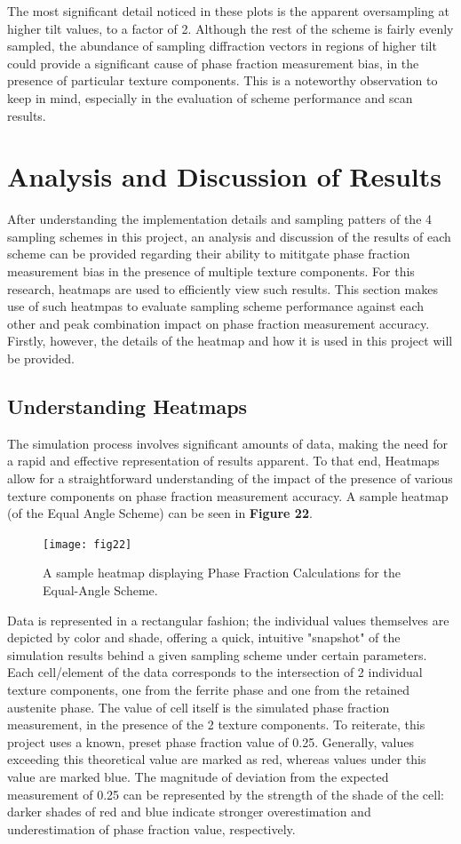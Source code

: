 \documentclass[10pt]{article}
\begin{document}
The most significant detail noticed in these plots is the apparent oversampling at higher tilt values, to a factor of 2. Although the rest
of the scheme is fairly evenly sampled, the abundance of sampling diffraction vectors in regions of higher tilt could provide a significant 
cause of phase fraction measurement bias, in the presence of particular texture components. This is a noteworthy observation to keep in mind,
especially in the evaluation of scheme performance and scan results.

\section{Analysis and Discussion of Results}
After understanding the implementation details and sampling patters of the 4 sampling schemes in this project, an analysis 
and discussion of the results of each scheme can be provided regarding their ability to mititgate phase fraction measurement
bias in the presence of multiple texture components. For this research, heatmaps are used to efficiently view such results. This section
makes use of such heatmpas to evaluate sampling scheme performance against each other and peak combination impact on phase fraction
measurement accuracy. Firstly, however,
the details of the heatmap and how it is used in this project will be provided.
\subsection{Understanding Heatmaps}
The simulation process involves significant amounts of data, making the need for a rapid and effective representation of results apparent. To that end, Heatmaps allow for a straightforward understanding of the impact of the presence of 
various texture components on phase fraction measurement accuracy. A sample heatmap (of the Equal Angle Scheme) can be seen in \textbf{Figure 22}.

\begin{figure}[h]
    \centering
    \texttt{[image: fig22]}
    \caption{\label{tab1}A sample heatmap displaying Phase Fraction Calculations for the Equal-Angle Scheme.} 
    \end{figure}

Data is represented in a rectangular fashion; the individual values themselves are depicted by color and shade, offering a quick, intuitive "snapshot" of the simulation results behind 
a given sampling scheme under certain parameters. Each cell/element of the data corresponds to the intersection of 2 individual texture components, one from the ferrite
phase and one from the retained austenite phase. The value of cell itself is the simulated phase fraction measurement, in the presence of the 2 texture components. 
To reiterate, this project uses a known, preset phase fraction value of 0.25. Generally, values exceeding this theoretical value are marked as red, whereas values under this
value are marked blue. The magnitude of deviation from the expected measurement of 0.25 can be represented by the strength of the shade of the cell: darker shades of red and 
blue indicate stronger overestimation and underestimation of phase fraction value, respectively. 
\end{document}
